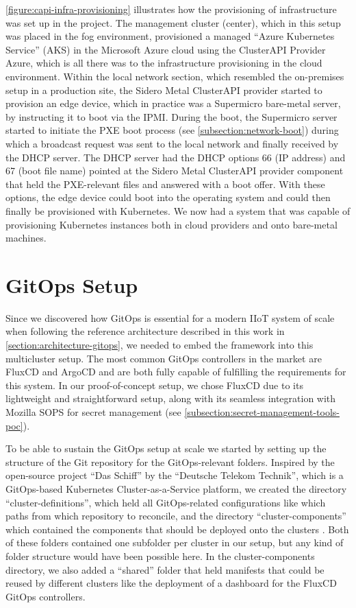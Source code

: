         \autoref{figure:capi-infra-provisioning} illustrates how the provisioning of infrastructure was set up in the project. The management cluster (center), which in this setup was placed in the fog environment, provisioned a managed ``Azure Kubernetes Service'' (AKS) in the Microsoft Azure cloud using the ClusterAPI Provider Azure, which is all there was to the infrastructure provisioning in the cloud environment. Within the local network section, which resembled the on-premises setup in a production site, the Sidero Metal ClusterAPI provider started to provision an edge device, which in practice was a Supermicro bare-metal server, by instructing it to boot via the IPMI. During the boot, the Supermicro server started to initiate the PXE boot process (see \autoref{subsection:network-boot}) during which a broadcast request was sent to the local network and finally received by the DHCP server. The DHCP server had the DHCP options 66 (IP address) and 67 (boot file name) pointed at the Sidero Metal ClusterAPI provider component that held the PXE-relevant files and answered with a boot offer. With these options, the edge device could boot into the operating system and could then finally be provisioned with Kubernetes. We now had a system that was capable of provisioning Kubernetes instances both in cloud providers and onto bare-metal machines. 

    \section{GitOps Setup}
    \label{section:gitops-poc-setup}
        
        Since we discovered how GitOps is essential for a modern IIoT system of scale when following the reference architecture described in this work in \autoref{section:architecture-gitops}, we needed to embed the framework into this multicluster setup. The most common GitOps controllers in the market are FluxCD and ArgoCD and are both fully capable of fulfilling the requirements for this system. In our proof-of-concept setup, we chose FluxCD due to its lightweight and straightforward setup, along with its seamless integration with Mozilla SOPS for secret management (see \autoref{subsection:secret-management-tools-poc}).\newline

        To be able to sustain the GitOps setup at scale we started by setting up the structure of the Git repository for the GitOps-relevant folders. Inspired by the open-source project ``Das Schiff'' by the ``Deutsche Telekom Technik'', which is a GitOps-based Kubernetes Cluster-as-a-Service platform, we created the directory ``cluster-definitions'', which held all GitOps-related configurations like which paths from which repository to reconcile, and the directory ``cluster-components'' which contained the components that should be deployed onto the clusters \cite{telekom_dasschiff}. Both of these folders contained one subfolder per cluster in our setup, but any kind of folder structure would have been possible here. In the cluster-components directory, we also added a ``shared'' folder that held manifests that could be reused by different clusters like the deployment of a dashboard for the FluxCD GitOps controllers.

